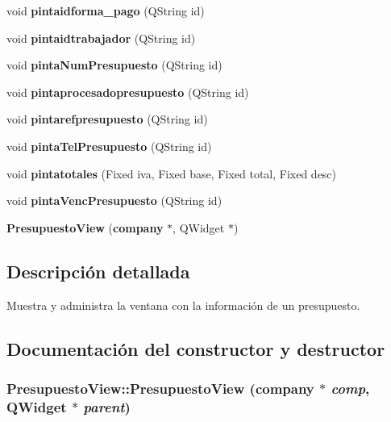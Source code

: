 \begin{CompactItemize}
\item 
void {\bf pintaidforma\_\-pago} (QString id)\label{classPresupuestoView_a11}

\item 
void {\bf pintaidtrabajador} (QString id)\label{classPresupuestoView_a12}

\item 
void {\bf pinta\-Num\-Presupuesto} (QString id)\label{classPresupuestoView_a13}

\item 
void {\bf pintaprocesadopresupuesto} (QString id)\label{classPresupuestoView_a14}

\item 
void {\bf pintarefpresupuesto} (QString id)\label{classPresupuestoView_a15}

\item 
void {\bf pinta\-Tel\-Presupuesto} (QString id)\label{classPresupuestoView_a16}

\item 
void {\bf pintatotales} (Fixed iva, Fixed base, Fixed total, Fixed desc)\label{classPresupuestoView_a17}

\item 
void {\bf pinta\-Venc\-Presupuesto} (QString id)\label{classPresupuestoView_a18}

\item 
{\bf Presupuesto\-View} ({\bf company} $\ast$, QWidget $\ast$)
\end{CompactItemize}


\subsection{Descripci\'{o}n detallada}
Muestra y administra la ventana con la informaci\'{o}n de un presupuesto. 



\subsection{Documentaci\'{o}n del constructor y destructor}
\subsubsection{\setlength{\rightskip}{0pt plus 5cm}Presupuesto\-View::Presupuesto\-View ({\bf company} $\ast$ {\em comp}, QWidget $\ast$ {\em parent})}\label{classPresupuestoView_a19}


